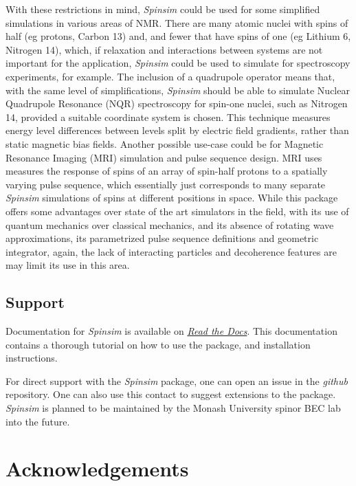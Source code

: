\documentclass{jors}
\begin{document}
		With these restrictions in mind, \emph{Spinsim} could be used for some simplified simulations in various areas of NMR.
		There are many atomic nuclei with spins of half (eg protons, Carbon 13) and, and fewer that have spins of one (eg Lithium 6, Nitrogen 14)\cite{fuller_nuclear_1976}, which, if relaxation and interactions between systems are not important for the application, \emph{Spinsim} could be used to simulate for spectroscopy experiments, for example.
		The inclusion of a quadrupole operator means that, with the same level of simplifications, \emph{Spinsim} should be able to simulate Nuclear Quadrupole Resonance (NQR) spectroscopy for spin-one nuclei\cite{bain_nqr_2004}, such as Nitrogen 14, provided a suitable coordinate system is chosen.
		This technique measures energy level differences between levels split by electric field gradients, rather than static magnetic bias fields.
		Another possible use-case could be for Magnetic Resonance Imaging (MRI) simulation and pulse sequence design.
		MRI uses measures the response of spins of an array of spin-half protons to a spatially varying pulse sequence\cite{mckinnon_physics_1998}, which essentially just corresponds to many separate \emph{Spinsim} simulations of spins at different positions in space.
		While this package offers some advantages over state of the art simulators in the field\cite{kose_fast_2019}, with its use of quantum mechanics over classical mechanics, and its absence of rotating wave approximations, its parametrized pulse sequence definitions and geometric integrator, again, the lack of interacting particles and decoherence features are may limit its use in this area.

	\subsection{Support}
		Documentation for \emph{Spinsim} is available on \href{https://spinsim.readthedocs.io/en/latest/}{\emph{Read the Docs}}.
		This documentation contains a thorough tutorial on how to use the package, and installation instructions.
		
		For direct support with the \emph{Spinsim} package, one can open an issue in the \emph{github} repository.
		One can also use this contact to suggest extensions to the package.
		\emph{Spinsim} is planned to be maintained by the Monash University spinor BEC lab into the future.

\section{Acknowledgements}
\end{document}
